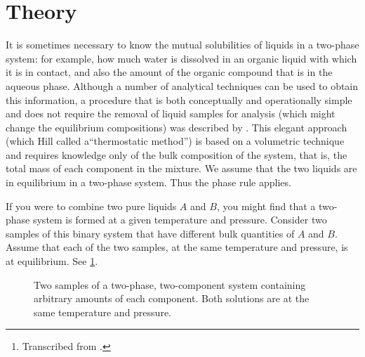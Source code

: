 \maketitle

\begin{abstract}
\noindent To construct the mutual solubility curve of a binary two-phase liquid system (for example, 1-butanol/water or methanol/cyclohexane).\thanks{Transcribed from \textcite{nibler14}.}
\end{abstract}

\section{Theory}
\label{sec:theory}

It is sometimes necessary to know the mutual solubilities of liquids in a two-phase system: for example, how much water is dissolved in an organic liquid with which it is in contact, and also the amount of the organic compound that is in the aqueous phase. Although a number of analytical techniques can be used to obtain this information, a procedure that is both conceptually and operationally simple and does not require the removal of liquid samples for analysis (which might change the equilibrium compositions) was described by \textcite{hill1923mutual}. This elegant approach (which Hill called a``thermostatic method'') is based on a volumetric technique and requires knowledge only of the bulk composition of the system, that is, the total mass of each component in the mixture. We assume that the two liquids are in equilibrium in a two-phase system. Thus the phase rule applies.

If you were to combine two pure liquids \(A\) and \(B\), you might find that a two-phase system is formed at a given temperature and pressure. Consider two samples of this binary system that have different bulk quantities of \(A\) and \(B\). Assume that each of the two samples, at the same temperature and pressure, is at equilibrium. See \cref{fig:two_samples}.

\begin{figure}[htb]
	\centering
	
	\caption{Two samples of a two-phase, two-component system containing arbitrary amounts of each component. Both solutions are at the same temperature and pressure.}
	\label{fig:two_samples}	
\end{figure}

